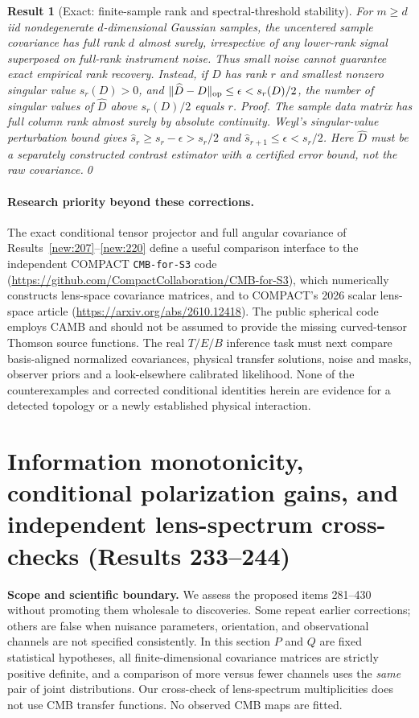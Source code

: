 \documentclass[aps,prd,onecolumn,notitlepage,groupedaddress,11pt]{revtex4-2}
\newtheorem{result}{Result}
\begin{document}
\begin{result}[\textsf{Exact}: finite-sample rank and spectral-threshold stability]\label{new:232}
For $m\ge d$ iid nondegenerate $d$-dimensional Gaussian samples, the uncentered sample covariance has full rank $d$ almost surely, irrespective of any lower-rank \emph{signal} superposed on full-rank instrument noise. Thus small noise cannot guarantee exact empirical rank recovery. Instead, if $D$ has rank $r$ and smallest nonzero singular value $s_r(D)>0$, and $\|\widehat D-D\|_{\rm op}\le\epsilon<s_r(D)/2$, the number of singular values of $\widehat D$ above $s_r(D)/2$ equals $r$. \textit{Proof.} The sample data matrix has full column rank almost surely by absolute continuity. Weyl's singular-value perturbation bound gives $\widehat s_r\ge s_r-\epsilon>s_r/2$ and $\widehat s_{r+1}\le\epsilon<s_r/2$. Here $\widehat D$ must be a separately constructed contrast estimator with a certified error bound, not the raw covariance.\qed
\end{result}

\paragraph{Research priority beyond these corrections.}
The exact conditional tensor projector and full angular covariance of Results~\ref{new:207}--\ref{new:220} define a useful comparison interface to the independent COMPACT \texttt{CMB-for-S3} code (\url{https://github.com/CompactCollaboration/CMB-for-S3}), which numerically constructs lens-space covariance matrices, and to COMPACT's 2026 scalar lens-space article (\url{https://arxiv.org/abs/2610.12418}). The public spherical code employs CAMB and should not be assumed to provide the missing curved-tensor Thomson source functions. The real $T/E/B$ inference task must next compare basis-aligned normalized covariances, physical transfer solutions, noise and masks, observer priors and a look-elsewhere calibrated likelihood. None of the counterexamples and corrected conditional identities herein are evidence for a detected topology or a newly established physical interaction.


\section{Information monotonicity, conditional polarization gains, and independent lens-spectrum cross-checks (Results 233--244)}
\label{sec:post232-independent}
\noindent\textbf{Scope and scientific boundary.} We assess the proposed items 281--430 without promoting them wholesale to discoveries. Some repeat earlier corrections; others are false when nuisance parameters, orientation, and observational channels are not specified consistently. In this section $P$ and $Q$ are fixed statistical hypotheses, all finite-dimensional covariance matrices are strictly positive definite, and a comparison of more versus fewer channels uses the \emph{same} pair of joint distributions. Our cross-check of lens-spectrum multiplicities does not use CMB transfer functions. No observed CMB maps are fitted.
\end{document}
